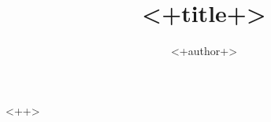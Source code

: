 \documentclass[a4paper]{scrartcl}
\title{<+title+>}
\author{<+author+>}
\begin{document}
\maketitle
\newpage

\tableofcontents
\newpage

<++>


\printbibliography
\end{document}
